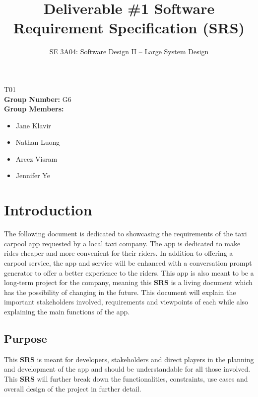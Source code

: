 \documentclass[]{article}
\title{Deliverable \#1 Software Requirement Specification (SRS)}
\author{SE 3A04: Software Design II -- Large System Design}
\date{}
\begin{document}
\maketitle	
{} T01\\
{\bf Group Number:} G6 \\
{\bf Group Members:} 
\begin{itemize}
	\item Jane Klavir
	\item Nathan Luong
	\item Areez Visram
	\item Jennifer Ye
\end{itemize}

\section{Introduction}
\label{sec:introduction}
The following document is dedicated to showcasing the requirements of the taxi carpool app requested by a local taxi company. The app is dedicated to make rides cheaper and more convenient for their riders. In addition to offering a carpool service, the app and service will be enhanced with a conversation prompt generator to offer a better experience to the riders. This app is also meant to be a long-term project for the company, meaning this \textbf{SRS} is a living document which has the possibility of changing in the future. This document will explain the important stakeholders involved, requirements and viewpoints of each while also explaining the main functions of the app. 
\subsection{Purpose}
\label{sub:purpose}
This \textbf{SRS} is meant for developers, stakeholders and direct players in the planning and development of the app and should be understandable for all those involved. This \textbf{SRS} will further break down the functionalities, constraints, use cases and overall design of the project in further detail. 

\end{document}
